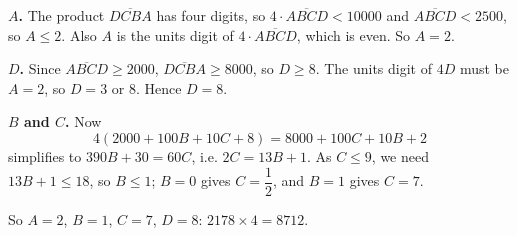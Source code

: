 \textbf{$A$.} The product $\overline{DCBA}$ has four digits, so $4\cdot\overline{ABCD}<10000$ and $\overline{ABCD}<2500$, so $A\le2$. Also $A$ is the units digit of $4\cdot\overline{ABCD}$, which is even. So $A=2$.

\textbf{$D$.} Since $\overline{ABCD}\ge2000$, $\overline{DCBA}\ge8000$, so $D\ge8$. The units digit of $4D$ must be $A=2$, so $D=3$ or $8$. Hence $D=8$.

\textbf{$B$ and $C$.} Now
\[
4(2000+100B+10C+8)=8000+100C+10B+2
\]
simplifies to $390B+30=60C$, i.e. $2C=13B+1$. As $C\le9$, we need $13B+1\le18$, so $B\le1$; $B=0$ gives $C=\dfrac{1}{2}$, and $B=1$ gives $C=7$.

So $A=2$, $B=1$, $C=7$, $D=8$: $\boxed{2178\times4=8712}$.
